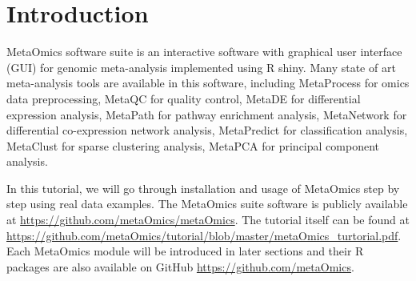 \section{Introduction}
 
MetaOmics software suite is an interactive software with graphical user interface (GUI) for genomic meta-analysis implemented using R shiny.
Many state of art meta-analysis tools are available in this software,
including MetaProcess for omics data preprocessing, 
MetaQC for quality control, 
MetaDE for differential expression analysis,
MetaPath for pathway enrichment analysis,
MetaNetwork for differential co-expression network analysis,
MetaPredict for classification analysis,
MetaClust for sparse clustering analysis,
MetaPCA for principal component analysis.

In this tutorial, 
we will go through installation and usage of MetaOmics step by step using real data examples.
The MetaOmics suite software is publicly available at \url{https://github.com/metaOmics/metaOmics}.
The tutorial itself can be found at \url{https://github.com/metaOmics/tutorial/blob/master/metaOmics_turtorial.pdf}.
Each MetaOmics module will be introduced in later sections and their R packages are also available on GitHub \url{https://github.com/metaOmics}.


